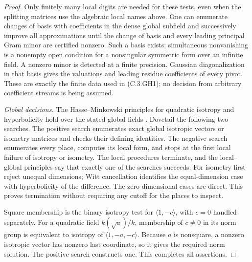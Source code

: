 \begin{proof}
Only finitely many local digits are needed for
these tests, even when the splitting matrices
use the algebraic local names above.
One can enumerate changes of basis with
coefficients in the dense global subfield and
successively improve all approximations until
the change of basis and every leading
principal Gram minor are certified nonzero.
Such a basis exists: simultaneous nonvanishing
is a nonempty open condition for a nonsingular
symmetric form over an infinite field.
A nonzero minor is detected at a finite
precision.  Gaussian diagonalization in
that basis gives the valuations and leading
residue coefficients of every pivot.
These are exactly the finite data used in
(C.3.GH1); no decision from arbitrary
coefficient streams is being assumed.

\emph{Global decisions.}
The Hasse--Minkowski principles for quadratic
isotropy and hyperbolicity hold over the stated
global fields
\cite[Introduction, pp.\ 1--2]{C-LewisUngerVanGeel2004}.
Dovetail the following two searches.
The positive search enumerates exact global
isotropic vectors or isometry matrices and
checks their defining identities.
The negative search enumerates every place,
computes its local form, and stops at the
first local failure of isotropy or isometry.
The local procedures terminate, and the
local--global principles say that exactly
one of the searches succeeds.
For isometry first reject unequal dimensions;
Witt cancellation identifies the equal-dimension
case with hyperbolicity of the difference.
The zero-dimensional cases are direct.
This proves termination without requiring
any cutoff for the places to inspect.

Square membership is the binary isotropy
test for $\langle1,-c\rangle$, with $c=0$
handled separately.
For a quadratic field $k(\sqrt a)/k$,
membership of $c\ne0$ in its norm group
is equivalent to isotropy of
$\langle1,-a,-c\rangle$.
Because $a$ is nonsquare, a nonzero
isotropic vector has nonzero last
coordinate, so it gives the required
norm solution.  The positive search
constructs one.
This completes all assertions.
\end{proof}

